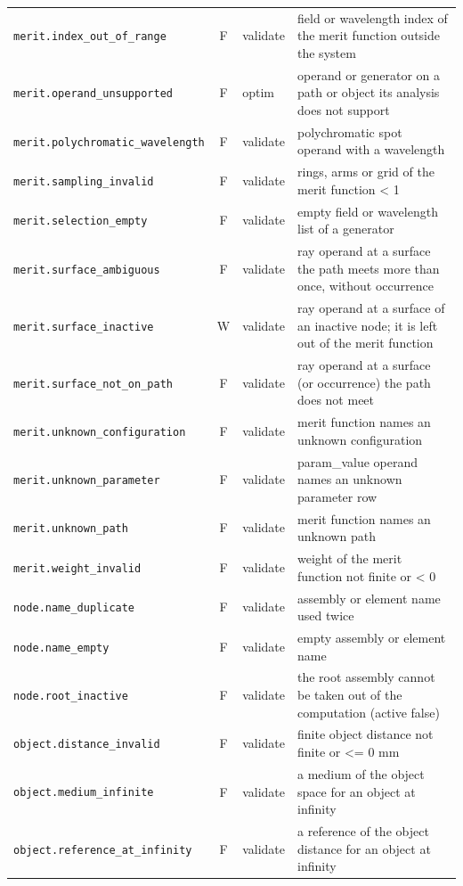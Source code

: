 \documentclass[11pt,a4paper,openany]{book}
\begin{document}
{\begin{longtable}{@{}L{6.1cm}cL{1.3cm}L{6.9cm}@{}}
\texttt{merit.index\_out\_of\_range} & F & validate & field or wavelength index of the merit function outside the system \\
\texttt{merit.operand\_unsupported} & F & optim & operand or generator on a path or object its analysis does not support \\
\texttt{merit.polychromatic\_wavelength} & F & validate & polychromatic spot operand with a wavelength \\
\texttt{merit.sampling\_invalid} & F & validate & rings, arms or grid of the merit function < 1 \\
\texttt{merit.selection\_empty} & F & validate & empty field or wavelength list of a generator \\
\texttt{merit.surface\_ambiguous} & F & validate & ray operand at a surface the path meets more than once, without occurrence \\
\texttt{merit.surface\_inactive} & W & validate & ray operand at a surface of an inactive node; it is left out of the merit function \\
\texttt{merit.surface\_not\_on\_path} & F & validate & ray operand at a surface (or occurrence) the path does not meet \\
\texttt{merit.unknown\_configuration} & F & validate & merit function names an unknown configuration \\
\texttt{merit.unknown\_parameter} & F & validate & param\_value operand names an unknown parameter row \\
\texttt{merit.unknown\_path} & F & validate & merit function names an unknown path \\
\texttt{merit.weight\_invalid} & F & validate & weight of the merit function not finite or < 0 \\
\texttt{node.name\_duplicate} & F & validate & assembly or element name used twice \\
\texttt{node.name\_empty} & F & validate & empty assembly or element name \\
\texttt{node.root\_inactive} & F & validate & the root assembly cannot be taken out of the computation (active false) \\
\texttt{object.distance\_invalid} & F & validate & finite object distance not finite or <= 0 mm \\
\texttt{object.medium\_infinite} & F & validate & a medium of the object space for an object at infinity \\
\texttt{object.reference\_at\_infinity} & F & validate & a reference of the object distance for an object at infinity \\

\end{longtable}}
\end{document}
